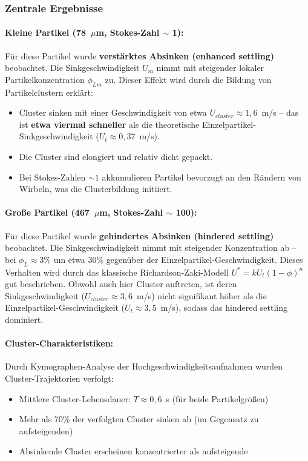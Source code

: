 \documentclass[a4paper,12pt]{article}
\begin{document}
\subsubsection*{Zentrale Ergebnisse}

\paragraph{Kleine Partikel (78~$\mu$m, Stokes-Zahl $\sim$ 1):}
F\"ur diese Partikel wurde \textbf{verst\"arktes Absinken (enhanced settling)} beobachtet. Die Sinkgeschwindigkeit $U_m$ nimmt mit steigender lokaler Partikelkonzentration $\phi_{Lm}$ zu. Dieser Effekt wird durch die Bildung von Partikelclustern erkl\"art:
\begin{itemize}
    \item Cluster sinken mit einer Geschwindigkeit von etwa $U_{cluster} \approx 1{,}6$~m/s -- das ist \textbf{etwa viermal schneller} als die theoretische Einzelpartikel-Sinkgeschwindigkeit ($U_t \approx 0{,}37$~m/s).
    \item Die Cluster sind elongiert und relativ dicht gepackt.
    \item Bei Stokes-Zahlen $\sim 1$ akkumulieren Partikel bevorzugt an den R\"andern von Wirbeln, was die Clusterbildung initiiert.
\end{itemize}

\paragraph{Gro\ss{}e Partikel (467~$\mu$m, Stokes-Zahl $\sim$ 100):}
F\"ur diese Partikel wurde \textbf{gehindertes Absinken (hindered settling)} beobachtet. Die Sinkgeschwindigkeit nimmt mit steigender Konzentration ab -- bei $\phi_L \approx 3\%$ um etwa 30\% gegen\"uber der Einzelpartikel-Geschwindigkeit. Dieses Verhalten wird durch das klassische Richardson-Zaki-Modell $U^* = kU_t(1-\phi)^n$ gut beschrieben. Obwohl auch hier Cluster auftreten, ist deren Sinkgeschwindigkeit ($U_{cluster} \approx 3{,}6$~m/s) nicht signifikant h\"oher als die Einzelpartikel-Geschwindigkeit ($U_t \approx 3{,}5$~m/s), sodass das hindered settling dominiert.

\paragraph{Cluster-Charakteristiken:}
Durch Kymographen-Analyse der Hochgeschwindigkeitsaufnahmen wurden Cluster-Trajektorien verfolgt:
\begin{itemize}
    \item Mittlere Cluster-Lebensdauer: $T \approx 0{,}6$~s (f\"ur beide Partikelgr\"o\ss{}en)
    \item Mehr als 70\% der verfolgten Cluster sinken ab (im Gegensatz zu aufsteigenden)
    \item Absinkende Cluster erscheinen konzentrierter als aufsteigende
\end{itemize}
\end{document}
